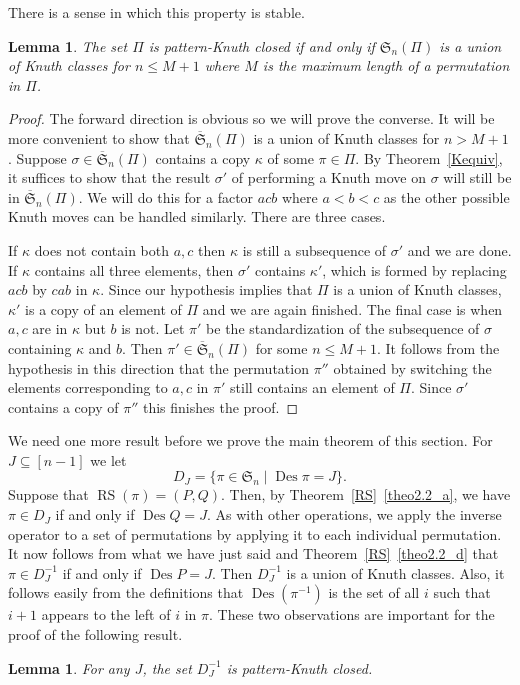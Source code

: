 \documentclass[10pt]{amsart}
\newtheorem{lemma}[theo]{Lemma}
\DeclareMathOperator{\RS}{RS}
\newcommand{\ofS}{\ol{\fS}}
\newcommand{\ol}{\overline}
\newcommand{\sbe}{\subseteq}
\newcommand{\ka}{\kappa}
\newcommand{\si}{\sigma}
\newcommand{\fS}{{\mathfrak S}}
\DeclareMathOperator{\Des}{Des}
\begin{document}
There is a sense in which this property is stable.
\begin{lemma}
\label{pkc:M}
The set $\Pi$ is pattern-Knuth closed if and only if $\fS_n(\Pi)$ is a union of Knuth classes for $n\le M+1$ where $M$ is the maximum length of a permutation in $\Pi$.
\end{lemma}
\begin{proof}
The forward direction is obvious so we will prove the converse. It will be more convenient to show that $\ofS_n(\Pi)$ is a union of Knuth classes for $n>M+1$. Suppose $\si\in\ofS_n(\Pi)$ contains a copy $\ka$ of some $\pi\in\Pi$. By Theorem~\ref{Kequiv}, it suffices to show that the result $\si'$ of performing a Knuth move on $\si$ will still be in $\ofS_n(\Pi)$. We will do this for a factor $acb$ where $a<b<c$ as the other possible Knuth moves can be handled similarly. There are three cases.

If $\ka$ does not contain both $a,c$ then $\ka$ is still a subsequence of $\si'$ and we are done. If $\ka$ contains all three elements, then $\si'$ contains $\ka'$, which is formed by replacing $acb$ by $cab$ in $\ka$. Since our hypothesis implies that $\Pi$ is a union of Knuth classes, $\ka'$ is a copy of an element of $\Pi$ and we are again finished. The final case is when $a,c$ are in $\ka$ but $b$ is not. Let $\pi'$ be the standardization of the subsequence of $\si$ containing $\ka$ and $b$. Then $\pi'\in\ofS_n(\Pi)$ for some $n\le M+1$. It follows from the hypothesis in this direction that the permutation $\pi''$ obtained by switching the elements corresponding to $a,c$ in $\pi'$ still contains an element of $\Pi$. Since $\si'$ contains a copy of $\pi''$ this finishes the proof.
\end{proof}
\setcounter{theo}{6}
We need one more result before we prove the main theorem of this section. For $J\sbe [n-1]$ we let
\[
D_J =\{\pi\in\fS_n \mid \Des\pi= J\}.
\]
Suppose that $\RS(\pi)=(P,Q)$. Then, by Theorem~\ref{RS}~\eqref{theo2.2_a}, we have $\pi\in D_J$ if and only if $\Des Q= J$. As with other operations, we apply the inverse operator to a set of permutations by applying it to each individual permutation. It now follows from what we have just said and Theorem~\ref{RS}~\eqref{theo2.2_d} that $\pi\in D_J^{-1}$ if and only if $\Des P = J$. Then $D_J^{-1}$ is a union of Knuth classes. Also, it follows easily from the definitions that $\Des(\pi^{-1})$ is the set of all $i$ such that $i+1$ appears to the left of $i$ in $\pi$. These two observations are important for the proof of the following result.
\begin{lemma}
\label{DJ-1}
For any $J$, the set $D_J^{-1}$ is pattern-Knuth closed.%
\end{lemma}
\end{document}
